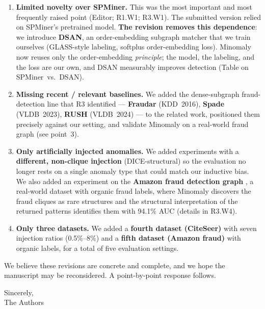 \documentclass[11pt]{article}
\begin{document}
\begin{enumerate}[leftmargin=1.6em,itemsep=3pt]
  \item \textbf{Limited novelty over SPMiner.} This was the most important and most frequently raised point (Editor; R1.W1; R3.W1). The submitted version relied on SPMiner's pretrained model. \textbf{The revision removes this dependence}: we introduce \textbf{DSAN}, an order-embedding subgraph matcher that we train ourselves (GLASS-style labeling, softplus order-embedding loss). Minomaly now reuses only the order-embedding \emph{principle}; the model, the labeling, and the loss are our own, and DSAN measurably improves detection (Table on SPMiner~vs.~DSAN).
  \item \textbf{Missing recent / relevant baselines.} We added the dense-subgraph fraud-detection line that R3 identified --- \textbf{Fraudar} (KDD~2016), \textbf{Spade} (VLDB~2023), \textbf{RUSH} (VLDB~2024) --- to the related work, positioned them precisely against our setting, and validate Minomaly on a real-world fraud graph (see point~3).
  \item \textbf{Only artificially injected anomalies.} We added experiments with a \textbf{different, non-clique injection} (DICE-structural) so the evaluation no longer rests on a single anomaly type that could match our inductive bias. We also added an experiment on the \textbf{Amazon fraud detection graph} \citep{dou2020enhancing}, a real-world dataset with organic fraud labels, where Minomaly discovers the fraud cliques as rare structures and the structural interpretation of the returned patterns identifies them with 94.1\% AUC (details in R3.W4).
  \item \textbf{Only three datasets.} We added a \textbf{fourth dataset (CiteSeer)} with seven injection ratios (0.5\%--8\%) and a \textbf{fifth dataset (Amazon fraud)} with organic labels, for a total of five evaluation settings.
\end{enumerate}

We believe these revisions are concrete and complete, and we hope the manuscript may be reconsidered. A point-by-point response follows.

\vspace{6pt}\noindent Sincerely,\\ The Authors

\end{document}
